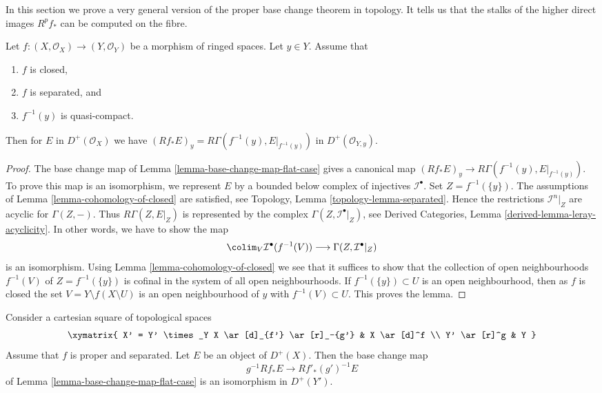 \noindent
In this section we prove a very general version of the proper base change
theorem in topology. It tells us that the stalks of the higher direct
images $R^pf_*$ can be computed on the fibre.

\begin{lemma}
\label{lemma-proper-base-change}
Let $f : (X, \mathcal{O}_X) \to (Y, \mathcal{O}_Y)$ be a morphism of
ringed spaces. Let $y \in Y$. Assume that
\begin{enumerate}
\item $f$ is closed,
\item $f$ is separated, and
\item $f^{-1}(y)$ is quasi-compact.
\end{enumerate}
Then for $E$ in $D^+(\mathcal{O}_X)$
we have $(Rf_*E)_y = R\Gamma(f^{-1}(y), E|_{f^{-1}(y)})$ in
$D^+(\mathcal{O}_{Y, y})$.
\end{lemma}

\begin{proof}
The base change map of Lemma \ref{lemma-base-change-map-flat-case}
gives a canonical map $(Rf_*E)_y \to R\Gamma(f^{-1}(y), E|_{f^{-1}(y)})$.
To prove this map is an isomorphism, we represent $E$ by a bounded
below complex of injectives $\mathcal{I}^\bullet$.
Set $Z = f^{-1}(\{y\})$. The assumptions of
Lemma \ref{lemma-cohomology-of-closed}
are satisfied, see Topology, Lemma \ref{topology-lemma-separated}.
Hence the restrictions
$\mathcal{I}^n|_Z$ are acyclic for $\Gamma(Z, -)$.
Thus $R\Gamma(Z, E|_Z)$ is represented by the
complex $\Gamma(Z, \mathcal{I}^\bullet|_Z)$, see
Derived Categories, Lemma \ref{derived-lemma-leray-acyclicity}.
In other words, we have to show the map
$$
\colim_V \mathcal{I}^\bullet(f^{-1}(V))
\longrightarrow
\Gamma(Z, \mathcal{I}^\bullet|_Z)
$$
is an isomorphism. Using Lemma \ref{lemma-cohomology-of-closed}
we see that it suffices to show that the collection of open neighbourhoods
$f^{-1}(V)$ of $Z = f^{-1}(\{y\})$
is cofinal in the system of all open neighbourhoods.
If $f^{-1}(\{y\}) \subset U$ is an open neighbourhood, then as $f$ is closed
the set $V = Y \setminus f(X \setminus U)$ is an open neighbourhood
of $y$ with $f^{-1}(V) \subset U$. This proves the lemma.
\end{proof}

\begin{theorem}
\label{theorem-proper-base-change}
\begin{reference}
\cite[Expose V bis, 4.1.1]{SGA4}
\end{reference}
Consider a cartesian square of topological spaces
$$
\xymatrix{
X' = Y' \times_Y X \ar[d]_{f'} \ar[r]_-{g'} & X \ar[d]^f \\
Y' \ar[r]^g & Y
}
$$
Assume that $f$ is proper and separated.
Let $E$ be an object of $D^+(X)$. Then the base change map
$$
g^{-1}Rf_*E \longrightarrow Rf'_*(g')^{-1}E
$$
of Lemma \ref{lemma-base-change-map-flat-case} is an isomorphism
in $D^+(Y')$.
\end{theorem}

